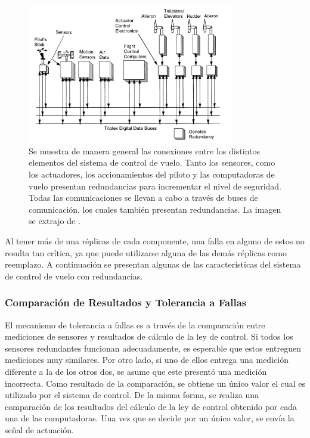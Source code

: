 \begin{figure}[H]
    \centering
    \includegraphics[width=0.8\textwidth]{img/diagrama_general_fly_by_wire.png}
    \caption{Se muestra de manera general las conexiones entre los distintos elementos del sistema de control de vuelo. Tanto los sensores, como los actuadores, los accionamientos del piloto y las computadoras de vuelo presentan redundancias para incrementar el nivel de seguridad. Todas las comunicaciones se llevan a cabo a través de buses de comunicación, los cuales también presentan redundancias. La imagen se extrajo de \cite{collinson2023introduction}.}
    \label{fig:diagrama_general_fly_by_wire}    
\end{figure}

Al tener más de una réplicas de cada componente, una falla en alguno de estos no resulta tan crítica, ya que puede utilizarse alguna de las demás réplicas como reemplazo. A continuación se presentan algunas de las características del sistema de control de vuelo con redundancias.

\subsubsection{Comparación de Resultados y Tolerancia a Fallas}

El mecanismo de tolerancia a fallas es a través de la comparación entre mediciones de sensores y resultados de cálculo de la ley de control. Si todos los sensores redundantes funcionan adecuadamente, es esperable que estos entreguen mediciones muy similares. Por otro lado, si uno de ellos entrega una medición diferente a la de los otros dos, se asume que este presentó una medición incorrecta. Como resultado de la comparación, se obtiene un único valor el cual es utilizado por el sistema de control. De la misma forma, se realiza una comparación de los resultados del cálculo de la ley de control obtenido por cada una de las computadoras. Una vez que se decide por un único valor, se envía la señal de actuación.

